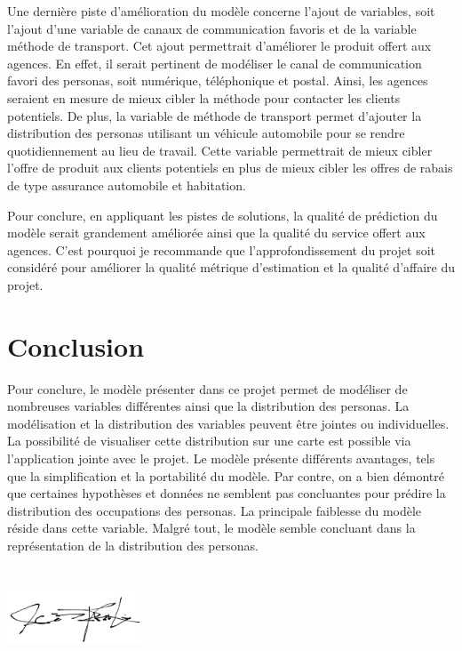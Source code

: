 \documentclass[11pt,french]{article}\usepackage[]{graphicx}\usepackage[]{color}
\begin{document}
Une dernière piste d'amélioration du modèle concerne l'ajout de variables, soit l'ajout d'une variable de canaux de communication favoris et de la variable méthode de transport. Cet ajout permettrait d'améliorer le produit offert aux agences. En effet, il serait pertinent de modéliser le canal de communication favori des personas, soit numérique, téléphonique et postal. Ainsi, les agences seraient en mesure de mieux cibler la méthode pour contacter les clients potentiels. De plus, la variable de méthode de transport permet d'ajouter la distribution des personas utilisant un véhicule automobile pour se rendre quotidiennement au lieu de travail. Cette variable permettrait de mieux cibler l'offre de produit aux clients potentiels en plus de mieux cibler les offres de rabais de type assurance automobile et habitation.
\newline

Pour conclure, en appliquant les pistes de solutions, la qualité de prédiction du modèle serait grandement améliorée ainsi que la qualité du service offert aux agences. C'est pourquoi je recommande que l'approfondissement du projet soit considéré pour améliorer la qualité métrique d'estimation et la qualité d'affaire du projet.
\newline

\section{Conclusion}

Pour conclure, le modèle présenter dans ce projet permet de modéliser de nombreuses variables différentes ainsi que la distribution des personas. La modélisation et la distribution des variables peuvent être jointes ou individuelles. La possibilité de visualiser cette distribution sur une carte est possible via l'application jointe avec le projet. Le modèle présente différents avantages, tels que la simplification et la portabilité du modèle. Par contre, on a bien démontré que certaines hypothèses et données ne semblent pas concluantes pour prédire la distribution des occupations des personas. La principale faiblesse du modèle réside dans cette variable. Malgré tout, le modèle semble concluant dans la représentation de la distribution des personas.


\includegraphics[height=3cm, width = 4cm]{fig/signature.png}
\end{document}
